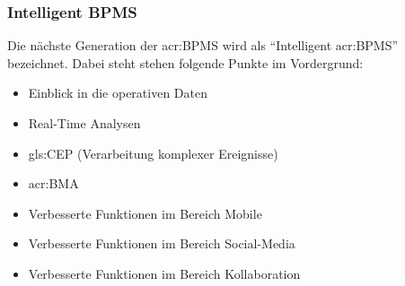\subsubsection{Intelligent BPMS}
Die nächste Generation der \gls{acr:BPMS} wird als "`Intelligent \gls{acr:BPMS}"' bezeichnet. Dabei steht stehen folgende Punkte im Vordergrund:

\begin{itemize}
\item Einblick in die operativen Daten
\item Real-Time Analysen
\item \gls{gls:CEP} (Verarbeitung komplexer Ereignisse)
\item \gls{acr:BMA}
\item Verbesserte Funktionen im Bereich Mobile
\item Verbesserte Funktionen im Bereich Social-Media
\item Verbesserte Funktionen im Bereich Kollaboration
\end{itemize}
